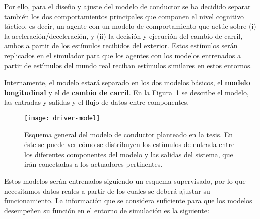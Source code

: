 Por ello, para el diseño y ajuste del modelo de conductor se ha decidido separar también los dos comportamientos principales que componen el nivel cognitivo táctico, es decir, un agente con un modelo de comportamiento que actúe sobre (i) la aceleración/deceleración, y (ii) la decisión y ejecución del cambio de carril, ambos a partir de los estímulos recibidos del exterior. Estos estímulos serán replicados en el simulador para que los agentes con los modelos entrenados a partir de estímulos del mundo real reciban estímulos similares en estos entornos.

Internamente, el modelo estará separado en los dos modelos básicos, el \textbf{modelo longitudinal} y el de \textbf{cambio de carril}. En la Figura~\ref{fig:overall-driver-model-schema} se describe el modelo, las entradas y salidas y el flujo de datos entre componentes.

\begin{figure}
	\centering
	\texttt{[image: driver-model]}
	\caption[Esquema general del modelo de conductor planteado]{Esquema general del modelo de conductor planteado en la tesis. En éste se puede ver cómo se distribuyen los estímulos de entrada entre los diferentes componentes del modelo y las salidas del sistema, que irán conectadas a los actuadores pertinentes.}
	\label{fig:overall-driver-model-schema}
\end{figure}

Estos modelos serán entrenados siguiendo un esquema supervisado, por lo que necesitamos datos reales a partir de los cuales se deberá ajustar su funcionamiento. La información que se considera suficiente para que los modelos desempeñen su función en el entorno de simulación es la siguiente:

